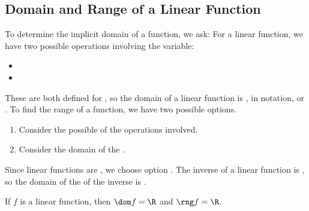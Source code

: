 \subsection{Domain and Range of a Linear Function} 
To determine the implicit domain of a function, we ask:\makeblanknewf\lbr
For a linear function, we have two possible operations involving the variable:
\begin{itemize}
\item \makeblankfill{}
\item \makeblankfill{}
\end{itemize}
These are both defined for \makeblank, so the domain of a linear function is \makeblank, in notation, \makeblanksmall or \makeblank[1in].\lbr
To find the range of a function, we have two possible options.
\begin{enumerate}
\item Consider the possible \makeblank[1.5in] of the operations involved.
\item Consider the domain of the \makeblank.
\end{enumerate}
Since linear functions are \makeblank, we choose option \makeblanksmall. The inverse of a linear function is \makeblank[1in], so the domain of the of the inverse is \makeblanksmall.
\begin{fact}
If $f$ is a linear function, then $\dom f=\R$ and $\rng f=\R$.
\end{fact}